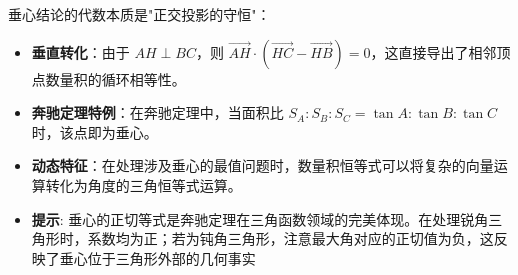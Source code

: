 \begin{explanationbox}
垂心结论的代数本质是"正交投影的守恒"：
\begin{itemize}
    \item \textbf{垂直转化}：由于 $AH \perp BC$，则 $\vec{AH} \cdot (\vec{HC} - \vec{HB}) = 0$，这直接导出了相邻顶点数量积的循环相等性。
    \item \textbf{奔驰定理特例}：在奔驰定理中，当面积比 $S_A : S_B : S_C = \tan A : \tan B : \tan C$ 时，该点即为垂心。
    \item \textbf{动态特征}：在处理涉及垂心的最值问题时，数量积恒等式可以将复杂的向量运算转化为角度的三角恒等式运算。
    \item \textbf{提示}: 垂心的正切等式是奔驰定理在三角函数领域的完美体现。在处理锐角三角形时，系数均为正；若为钝角三角形，注意最大角对应的正切值为负，这反映了垂心位于三角形外部的几何事实
\end{itemize}
\end{explanationbox}